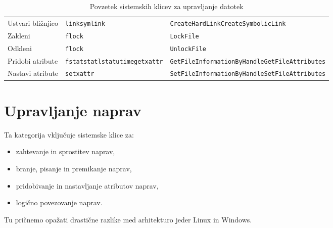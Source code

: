 \documentclass[a4paper,12pt,openright]{book}
\begin{document}
\begin{table}[h!]
\begin{center}
\begin{tabular}{ p{3.7cm}|p{2.5cm}|p{6cm} }
			Ustvari bližnjico & \verb|link|\newline\verb|symlink|                                                              & \verb|CreateHardLink|\newline\verb|CreateSymbolicLink|            \\
			Zakleni            & \verb|flock|                                                                                   & \verb|LockFile|                                                   \\
			Odkleni            & \verb|flock|                                                                                   & \verb|UnlockFile|                                                 \\
			Pridobi atribute   & \verb|fstat|\newline\verb|stat|\newline\verb|lstat|\newline\verb|utime|\newline\verb|getxattr| & \verb|GetFileInformationByHandle|\newline\verb|GetFileAttributes| \\
			Nastavi atribute   & \verb|setxattr|                                                                                & \verb|SetFileInformationByHandle|\newline\verb|SetFileAttributes| \\
		\end{tabular}
	\end{center}
	\label{tab:file_management}
	\caption{Povzetek sistemskih klicev za upravljanje datotek}
\end{table}

\section{Upravljanje naprav}

Ta kategorija vključuje sistemske klice za:
\begin{itemize}
	\item zahtevanje in sprostitev naprav,
	\item branje, pisanje in premikanje naprav,
	\item pridobivanje in nastavljanje atributov naprav,
	\item logično povezovanje naprav. \cite{Silberschatz_Galvin_Gagne_2018}
\end{itemize}

Tu pričnemo opažati drastične razlike med arhitekturo jeder Linux in Windows.
\end{document}
